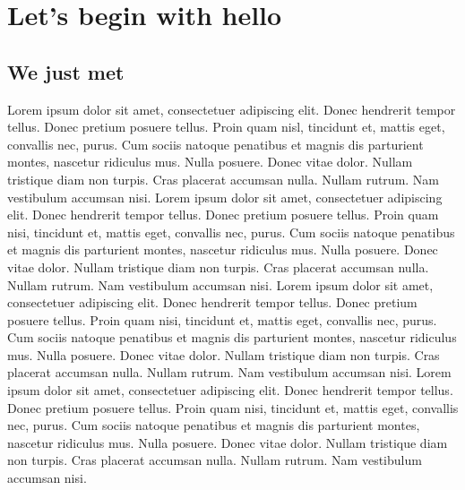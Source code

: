 \documentclass[12pt]{report}
\begin{document}
\chapter{Let's begin with hello}


\section{We just met}

Lorem ipsum dolor sit amet, consectetuer adipiscing elit. Donec
hendrerit tempor tellus. Donec pretium posuere tellus. Proin quam
nisl, tincidunt et, mattis eget, convallis nec, purus. Cum sociis
natoque penatibus et magnis dis parturient montes, nascetur ridiculus
mus. Nulla posuere. Donec vitae dolor. Nullam tristique diam non
turpis. Cras placerat accumsan nulla. Nullam rutrum. Nam vestibulum
accumsan nisi.  Lorem ipsum dolor sit amet, consectetuer adipiscing
elit. Donec hendrerit tempor tellus. Donec pretium posuere
tellus. Proin quam nisi, tincidunt et, mattis eget, convallis nec,
purus. Cum sociis natoque penatibus et magnis dis parturient montes,
nascetur ridiculus mus. Nulla posuere. Donec vitae dolor. Nullam
tristique diam non turpis. Cras placerat accumsan nulla. Nullam
rutrum. Nam vestibulum accumsan nisi.  Lorem ipsum dolor sit amet,
consectetuer adipiscing elit. Donec hendrerit tempor tellus. Donec
pretium posuere tellus. Proin quam nisi, tincidunt et, mattis eget,
convallis nec, purus. Cum sociis natoque penatibus et magnis dis
parturient montes, nascetur ridiculus mus. Nulla posuere. Donec vitae
dolor. Nullam tristique diam non turpis. Cras placerat accumsan
nulla. Nullam rutrum. Nam vestibulum accumsan nisi.  Lorem ipsum dolor
sit amet, consectetuer adipiscing elit. Donec hendrerit tempor
tellus. Donec pretium posuere tellus. Proin quam nisi, tincidunt et,
mattis eget, convallis nec, purus. Cum sociis natoque penatibus et
magnis dis parturient montes, nascetur ridiculus mus. Nulla
posuere. Donec vitae dolor. Nullam tristique diam non turpis. Cras
placerat accumsan nulla. Nullam rutrum. Nam vestibulum accumsan nisi.
\end{document}
